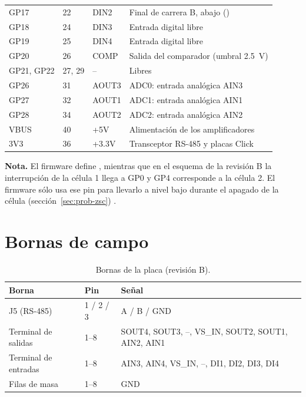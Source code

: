 \begin{longtable}{@{}lllL{0.44\textwidth}@{}}
GP17 & 22 & DIN2    & Final de carrera B, abajo () \\
GP18 & 24 & DIN3    & Entrada digital libre \\
GP19 & 25 & DIN4    & Entrada digital libre \\
GP20 & 26 & COMP    & Salida del comparador (umbral \SI{2.5}{\volt}) \\
GP21, GP22 & 27, 29 & -- & Libres \\
GP26 & 31 & AOUT3   & ADC0: entrada analógica AIN3 \\
GP27 & 32 & AOUT1   & ADC1: entrada analógica AIN1 \\
GP28 & 34 & AOUT2   & ADC2: entrada analógica AIN2 \\
VBUS & 40 & +5V     & Alimentación de los amplificadores \\
3V3  & 36 & +3.3V   & Transceptor RS-485 y placas Click \\
\bottomrule
\end{longtable}

\noindent\textbf{Nota.} El firmware define , mientras que en el esquema de
la revisión B la interrupción de la célula 1 llega a GP0 y GP4 corresponde a la célula 2. El firmware
sólo usa ese pin para llevarlo a nivel bajo durante el apagado de la célula
(sección~\ref{sec:prob-zsc}) .

\section{Bornas de campo}

\begin{table}[H]
\centering
\caption{Bornas de la placa (revisión B).}
\label{tab:bornas}
\begin{tabular}{@{}lll@{}}
\toprule
Borna & Pin & Señal \\
\midrule
J5 (RS-485) & 1 / 2 / 3 & A / B / GND \\
Terminal de salidas & 1--8 & SOUT4, SOUT3, --, VS\_IN, SOUT2, SOUT1, AIN2, AIN1 \\
Terminal de entradas & 1--8 & AIN3, AIN4, VS\_IN, --, DI1, DI2, DI3, DI4 \\
Filas de masa & 1--8 & GND \\
\bottomrule
\end{tabular}
\end{table}

